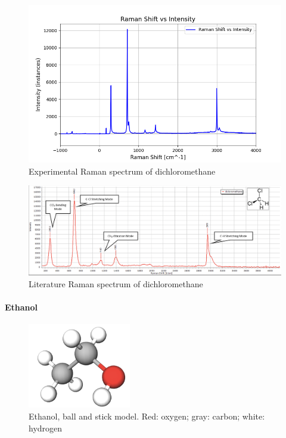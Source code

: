     \newpage

    \begin{figure}[h]
        \centering
        \includegraphics[width=\textwidth]{images/raman_spectra/raman_shift_DCM.png}
        \caption{Experimental Raman spectrum of dichloromethane}
        \label{fig:dcm_x}
        \vspace{30pt}
    \end{figure}

    \begin{figure}[h]
        \includegraphics[width=\textwidth]{images/lit_raman/dichloromethane.png}
        \caption{Literature Raman spectrum of dichloromethane \cite{spectrumdcm}}
        \label{fig:dcm_l}
    \end{figure}

    \newpage

\paragraph{Ethanol}

    \begin{figure} %
        \centering
        \vspace{-20pt}
        \includegraphics[width=0.4\textwidth]{images/raman_spectra/eth_i.png}
        \caption{Ethanol, ball and stick model. Red: oxygen; gray: carbon; white: hydrogen}
        \label{fig:eth_i}
    \end{figure}


